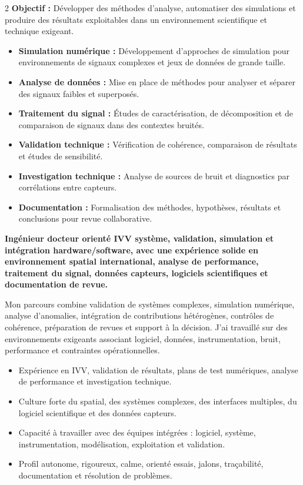 \documentclass[8pt,a4paper,ragged2e,withhyper]{altacv}
\begin{document}
\begin{paracol}{2}
\textbf{Objectif :} Développer des méthodes d’analyse, automatiser des simulations et produire des résultats exploitables dans un environnement scientifique et technique exigeant.

\begin{itemize}
  \item \textbf{Simulation numérique :} Développement d’approches de simulation pour environnements de signaux complexes et jeux de données de grande taille.
  \item \textbf{Analyse de données :} Mise en place de méthodes pour analyser et séparer des signaux faibles et superposés.
  \item \textbf{Traitement du signal :} Études de caractérisation, de décomposition et de comparaison de signaux dans des contextes bruités.
  \item \textbf{Validation technique :} Vérification de cohérence, comparaison de résultats et études de sensibilité.
  \item \textbf{Investigation technique :} Analyse de sources de bruit et diagnostics par corrélations entre capteurs.
  \item \textbf{Documentation :} Formalisation des méthodes, hypothèses, résultats et conclusions pour revue collaborative.
\end{itemize}

\switchcolumn


\textbf{Ingénieur docteur orienté IVV système, validation, simulation et intégration hardware/software, avec une expérience solide en environnement spatial international, analyse de performance, traitement du signal, données capteurs, logiciels scientifiques et documentation de revue.}

Mon parcours combine validation de systèmes complexes, simulation numérique, analyse d’anomalies, intégration de contributions hétérogènes, contrôles de cohérence, préparation de revues et support à la décision. J’ai travaillé sur des environnements exigeants associant logiciel, données, instrumentation, bruit, performance et contraintes opérationnelles.

\begin{itemize}
  \item Expérience en IVV, validation de résultats, plans de test numériques, analyse de performance et investigation technique.
  \item Culture forte du spatial, des systèmes complexes, des interfaces multiples, du logiciel scientifique et des données capteurs.
  \item Capacité à travailler avec des équipes intégrées : logiciel, système, instrumentation, modélisation, exploitation et validation.
  \item Profil autonome, rigoureux, calme, orienté essais, jalons, traçabilité, documentation et résolution de problèmes.
\end{itemize}


\end{paracol}
\end{document}
